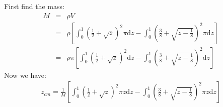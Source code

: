 \documentclass{article}
\newcommand{\de}{\mathrm{d}}
\begin{document}
\begin{enumerate}
        First find the mass:
        \begin{eqnarray*}
        M &=& \rho V \\
        &=& \rho [\int_0^1 (\frac{1}{2} + \sqrt{z})^2\pi \de z - \int_0^1 (\frac{3}{8} + \sqrt{z-\frac{1}{8}})^2\pi \de z]\\
        &=& \rho \pi [\int_0^1 (\frac{1}{2} + \sqrt{z})^2 \de z - \int_0^1 (\frac{3}{8} + \sqrt{z-\frac{1}{8}})^2 \de z]
        \end{eqnarray*}
        Now we have:
        \begin{eqnarray*}
        z_{cm} = \frac{1}{M} [\int_0^1 (\frac{1}{2} + \sqrt{z})^2\pi z \de z - \int_0^1 (\frac{3}{8} + \sqrt{z-\frac{1}{8}})^2\pi z \de z]
        \end{eqnarray*}
    \end{enumerate}




\end{document}
